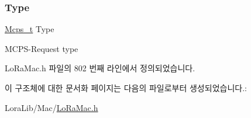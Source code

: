 \mbox{\label{structs_mcps_req_a29993a5d65888bf0f36ec406896bb540}} 
\subsubsection{\texorpdfstring{Type}{Type}}
{\footnotesize\ttfamily \mbox{\hyperlink{group___l_o_r_a_m_a_c_ga670d0c87a52aeb13391f303a4cf94f00}{Mcps\+\_\+t}} Type}

M\+C\+P\+S-\/\+Request type 

Lo\+Ra\+Mac.\+h 파일의 802 번째 라인에서 정의되었습니다.



이 구조체에 대한 문서화 페이지는 다음의 파일로부터 생성되었습니다.\+:\begin{DoxyCompactItemize}
\item 
Lora\+Lib/\+Mac/\mbox{\hyperlink{_lo_ra_mac_8h}{Lo\+Ra\+Mac.\+h}}\end{DoxyCompactItemize}
